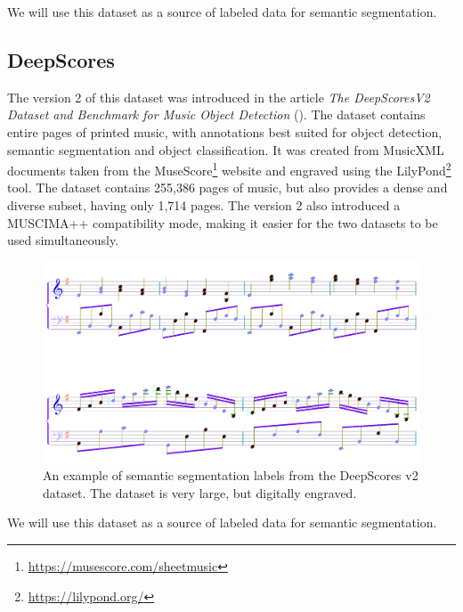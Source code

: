 We will use this dataset as a source of labeled data for semantic segmentation.


\subsection{DeepScores}

The version 2 of this dataset was introduced in the article \emph{The DeepScoresV2 Dataset and Benchmark for Music Object Detection} (\cite{DeepScores}). The dataset contains entire pages of printed music, with annotations best suited for object detection, semantic segmentation and object classification. It was created from MusicXML documents taken from the MuseScore\footnote{\url{https://musescore.com/sheetmusic}} website and engraved using the LilyPond\footnote{\url{https://lilypond.org/}} tool. The dataset contains 255,386 pages of music, but also provides a dense and diverse subset, having only 1,714 pages. The version 2 also introduced a MUSCIMA++ compatibility mode, making it easier for the two datasets to be used simultaneously.

\begin{figure}[ht]
    \centering
    \includegraphics[width=145mm]{../img/deepscores.png}
    \caption{An example of semantic segmentation labels from the DeepScores v2 dataset. The dataset is very large, but digitally engraved.}
    \label{fig:DeepScoresV2}
\end{figure}

We will use this dataset as a source of labeled data for semantic segmentation.
